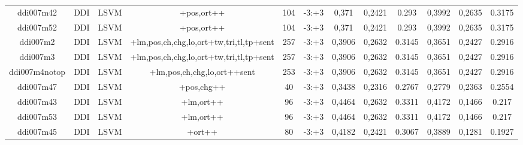 \documentclass[a4paper]{article}
\begin{document}
\begin{landscape}
\begin{center}
\begin{tabular}{ |c|c|c|c|c|c|c|c|c|c|c|c|}
 	
 
 	
 		
 		\small{ ddi007m42 } & DDI & LSVM & +pos,ort++  &  104 &  -3:+3  &  0,371 & 0,2421 & 0.293  &  0,3992 & 0,2635 & 0.3175 \\
 		

 	
 
 	
 		
 		\small{ ddi007m52 } & DDI & LSVM & +pos,ort++  &  104 &  -3:+3  &  0,371 & 0,2421 & 0.293  &  0,3992 & 0,2635 & 0.3175 \\
 		

 	
 
 	
 		
 		\small{ ddi007m2 } & DDI & LSVM & +lm,pos,ch,chg,lo,ort+tw,tri,tl,tp+sent  &  257 &  -3:+3  &  0,3906 & 0,2632 & 0.3145  &  0,3651 & 0,2427 & 0.2916 \\
 		

 	
 
 	
 		
 		\small{ ddi007m3 } & DDI & LSVM & +lm,pos,ch,chg,lo,ort+tw,tri,tl,tp+sent  &  257 &  -3:+3  &  0,3906 & 0,2632 & 0.3145  &  0,3651 & 0,2427 & 0.2916 \\
 		

 	
 
 	
 		
 		\small{ ddi007m4notop } & DDI & LSVM & +lm,pos,ch,chg,lo,ort++sent  &  253 &  -3:+3  &  0,3906 & 0,2632 & 0.3145  &  0,3651 & 0,2427 & 0.2916 \\
 		

 	
 
 	
 		
 		\small{ ddi007m47 } & DDI & LSVM & +pos,chg++  &  40 &  -3:+3  &  0,3438 & 0,2316 & 0.2767  &  0,2779 & 0,2363 & 0.2554 \\
 		

 	
 
 	
 		
 		\small{ ddi007m43 } & DDI & LSVM & +lm,ort++  &  96 &  -3:+3  &  0,4464 & 0,2632 & 0.3311  &  0,4172 & 0,1466 & 0.217 \\
 		

 	
 
 	
 		
 		\small{ ddi007m53 } & DDI & LSVM & +lm,ort++  &  96 &  -3:+3  &  0,4464 & 0,2632 & 0.3311  &  0,4172 & 0,1466 & 0.217 \\
 		

 	
 
 	
 		
 		\small{ ddi007m45 } & DDI & LSVM & +ort++  &  80 &  -3:+3  &  0,4182 & 0,2421 & 0.3067  &  0,3889 & 0,1281 & 0.1927 \\
 		


\end{tabular}
\end{center}
\end{landscape}
\end{document}
